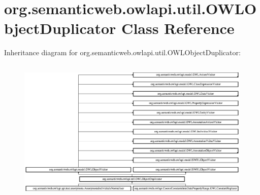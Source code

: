 \hypertarget{classorg_1_1semanticweb_1_1owlapi_1_1util_1_1_o_w_l_object_duplicator}{\section{org.\-semanticweb.\-owlapi.\-util.\-O\-W\-L\-Object\-Duplicator Class Reference}
\label{classorg_1_1semanticweb_1_1owlapi_1_1util_1_1_o_w_l_object_duplicator}
}
Inheritance diagram for org.\-semanticweb.\-owlapi.\-util.\-O\-W\-L\-Object\-Duplicator\-:\begin{figure}[H]
\begin{center}
\leavevmode
\includegraphics[height=7.013487cm]{classorg_1_1semanticweb_1_1owlapi_1_1util_1_1_o_w_l_object_duplicator}
\end{center}
\end{figure}
